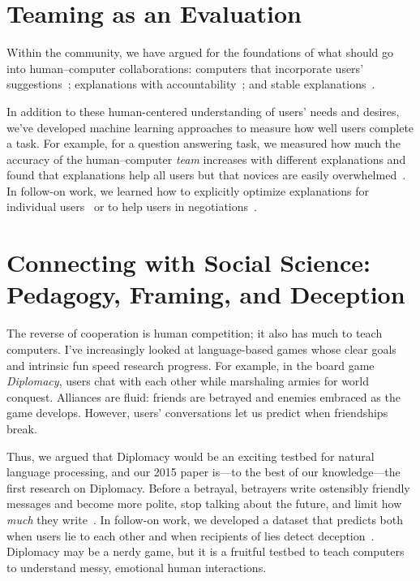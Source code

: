 \section{Teaming as an Evaluation}

Within the  community, we have argued for the foundations of
what should go into human--computer collaborations: computers that incorporate
users' suggestions~\cite{kumar-19}; explanations with
accountability~\cite{smith-20}; and stable
explanations~\cite{smith-20:adherence}.

In addition to these human-centered understanding of users' needs and
desires, we've developed machine learning approaches to measure how
well users complete a task.
%
For example, for a question answering task, we measured how much the
accuracy of the human--computer \emph{team} increases with different
explanations and found that explanations help all users but that
novices are easily overwhelmed~\cite{feng-19}.
%
In follow-on work, we learned how to explicitly optimize explanations
for individual users~\cite{feng-22} or to help users in negotiations~\cite{Gu:Wongkamjan:Kummerfeld:Peskoff:May:Boyd-Graber-2025}.


\section{Connecting with Social Science: Pedagogy, Framing, and Deception}

The reverse of cooperation is human competition; it also has much to
teach computers.
%
I've increasingly looked at language-based games whose clear goals and
intrinsic fun speed research progress.
%
For example, in the board game \emph{Diplomacy}, users
chat with each other while marshaling armies for world conquest. Alliances are
fluid: friends are betrayed and enemies embraced as the game develops.
%
However,
users' conversations let us predict when friendships break.

Thus, we argued that Diplomacy would be an exciting testbed for
natural language processing, and our 2015 paper is---to the best of
our knowledge---the first  research on Diplomacy.
%
Before a betrayal, betrayers write ostensibly friendly messages and become more polite, stop talking about the future, and limit how \emph{much} they write~\cite{niculae-15}.
%
In follow-on work, we developed a dataset that predicts both when users
lie to each other and when recipients of lies detect
deception~\cite{Peskov-20}.
%
Diplomacy may be a nerdy game, but it is a fruitful testbed to teach
computers to understand messy, emotional human interactions.


